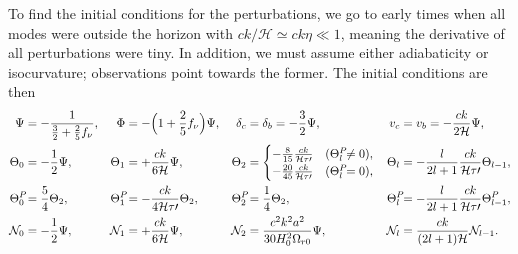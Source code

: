 \documentclass[10pt,a4paper]{article}
\begin{document}
To find the initial conditions for the perturbations,
we go to early times when all modes were outside the horizon with $ck/\mathcal{H} \simeq ck\eta \ll 1$,
meaning the derivative of all perturbations were tiny.
In addition, we must assume either adiabaticity or isocurvature; observations point towards the former.
The initial conditions are then
\begin{subequations}
\allowdisplaybreaks
\begin{align}
	\Psi &= -\frac{1}{\frac32 + \frac25 f_\nu}, &
	\Phi &= -\Big( 1 + \frac25 f_\nu \Big) \Psi, &
	\delta_c &= \delta_b = -\frac32 \Psi, &
	v_c &= v_b = -\frac{ck}{2\mathcal{H}} \Psi, \\
	\Theta_0 &= -\frac12 \Psi, &
	\Theta_1 &= +\frac{ck}{6\mathcal{H}} \Psi, &
	\Theta_2 &= \begin{cases} -\frac{8}{15} \frac{ck}{\mathcal{H} \tau\prime} & (\Theta^{\mathrlap{P}}_l \neq 0), \\ -\frac{20}{45} \frac{ck}{\mathcal{H} \tau\prime} & (\Theta^{\mathrlap{P}}_l = 0), \end{cases} &
	\Theta_l &= -\frac{l}{2l+1} \frac{ck}{\mathcal{H} \tau\prime} \Theta_{l-1}, \\
	\Theta^{\mathrlap{P}}_0 &= \frac54 \Theta_2, &
	\Theta^{\mathrlap{P}}_1 &= -\frac{ck}{4\mathcal{H}\tau\prime} \Theta_2, &
	\Theta^{\mathrlap{P}}_2 &= \frac14 \Theta_2, &
	\Theta^{\mathrlap{P}}_l &= -\frac{l}{2l+1} \frac{ck}{\mathcal{H}\tau\prime} \Theta^{\mathrlap{P}}_{l-1}, \\
	\N_0 &= -\frac12 \Psi, &
	\N_1 &= +\frac{ck}{6\mathcal{H}} \Psi, &
	\N_2 &=  \frac{c^2 k^2 a^2}{30 H_0^2 \Omega_{r0}} \Psi,&
	\N_l &= \frac{ck}{(2l+1)\mathcal{H}} \N_{l-1}.
\end{align}
\label{eq_perturb_ic}
\end{subequations}
\end{document}
